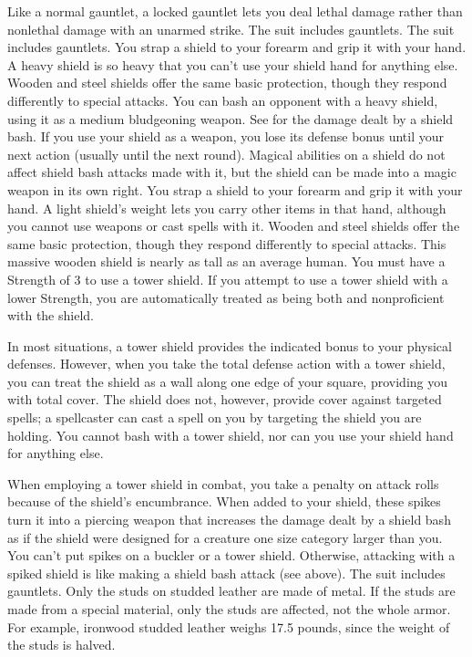 Like a normal gauntlet, a locked gauntlet lets you deal lethal damage rather than nonlethal damage with an unarmed strike.
 The suit includes gauntlets.
 The suit includes gauntlets.
 You strap a shield to your forearm and grip it with your hand. A heavy shield is so heavy that you can't use your shield hand for anything else.
 Wooden and steel shields offer the same basic protection, though they respond differently to special attacks.
 You can bash an opponent with a heavy shield, using it as a medium bludgeoning weapon. See  for the damage dealt by a shield bash.  If you use your shield as a weapon, you lose its defense bonus until your next action (usually until the next round). Magical abilities on a shield do not affect shield bash attacks made with it, but the shield can be made into a magic weapon in its own right.
 You strap a shield to your forearm and grip it with your hand. A light shield's weight lets you carry other items in that hand, although you cannot use weapons or cast spells with it.
 Wooden and steel shields offer the same basic protection, though they respond differently to special attacks.
 This massive wooden shield is nearly as tall as an average human. You must have a Strength of 3 to use a tower shield. If you attempt to use a tower shield with a lower Strength, you are automatically treated as being both  and nonproficient with the shield.

In most situations, a tower shield provides the indicated bonus to your physical defenses. However, when you take the total defense action with a tower shield, you can treat the shield as a wall along one edge of your square, providing you with total cover. The shield does not, however, provide cover against targeted spells; a spellcaster can cast a spell on you by targeting the shield you are holding. You cannot bash with a tower shield, nor can you use your shield hand for anything else.

When employing a tower shield in combat, you take a  penalty on attack rolls because of the shield's encumbrance.
 When added to your shield, these spikes turn it into a piercing weapon that increases the damage dealt by a shield bash as if the shield were designed for a creature one size category larger than you. You can't put spikes on a buckler or a tower shield. Otherwise, attacking with a spiked shield is like making a shield bash attack (see above).
 The suit includes gauntlets.
 Only the studs on studded leather are made of metal. If the studs are made from a special material, only the studs are affected, not the whole armor. For example, ironwood studded leather weighs 17.5 pounds, since the weight of the studs is halved.

